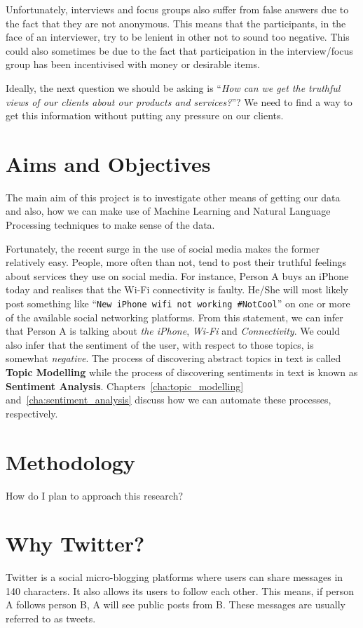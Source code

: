 Unfortunately, interviews and focus groups also suffer from false answers due to the fact that they
are not anonymous. This means that the participants, in the face of an interviewer, try to be
lenient in other not to sound too negative. This could also sometimes be due to the fact that
participation in the interview/focus group has been incentivised with money or desirable items.

Ideally, the next question we should be asking is ``\textit{How can we get the truthful views of our
clients about our products and services?}''? We need to find a way to get this information without
putting any pressure on our clients.

\section{Aims and Objectives}
\label{sec:objectives}
The main aim of this project is to investigate other means of getting our data and also, how we can
make use of Machine Learning and Natural Language Processing techniques to make sense of the data.

Fortunately, the recent surge in the use of social media makes the former relatively easy. People,
more often than not, tend to post their truthful feelings about services they use on social media.
For instance, Person A buys an iPhone today and realises that the Wi-Fi connectivity is faulty.
He/She will most likely post something like ``\texttt{New iPhone wifi not working \#NotCool}'' on
one or more of the available social networking platforms. From this statement, we can infer that
Person A is talking about \textit{the iPhone}, \textit{Wi-Fi} and \textit{Connectivity}. We could
also infer that the sentiment of the user, with respect to those topics, is somewhat
\textit{negative}. The process of discovering abstract topics in text is called \textbf{Topic
Modelling} while the process of discovering sentiments in text is known as \textbf{Sentiment
Analysis}. Chapters~\ref{cha:topic_modelling} and~\ref{cha:sentiment_analysis} discuss how we can
automate these processes, respectively.

\section{Methodology}
\label{sec:methodology}
How do I plan to approach this research?

\section{Why Twitter?}
\label{sec:why_twitter}
Twitter is a social micro-blogging platforms where users can share messages in 140 characters. It
also allows its users to follow each other. This means, if person A follows person B, A will see
public posts from B. These messages are usually referred to as tweets.

